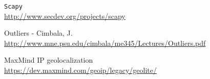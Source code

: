 \documentclass[%
	final, %
	notitlepage,
	narroweqnarray,
	inline,
	twoside,
	]{ieee}
\begin{document}
\begin{thebibliography}{1}






\texttt{Scapy}\\
\url{http://www.secdev.org/projects/scapy}

Outliers - Cimbala, J. \\
\url{http://www.mne.psu.edu/cimbala/me345/Lectures/Outliers.pdf}



MaxMind IP geolocalization \\
\url{https://dev.maxmind.com/geoip/legacy/geolite/}

\end{thebibliography}
\end{document}
